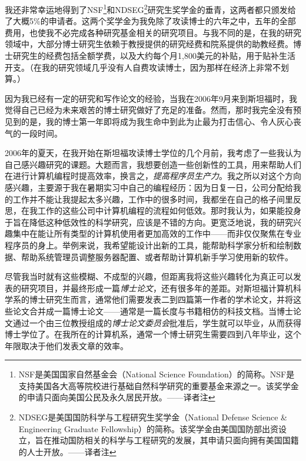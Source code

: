 \documentclass[letter,12pt]{book}
\begin{document}
\begin{CJK}{UTF8}{gbsn}
我还非常幸运地得到了NSF\footnote{NSF是美国国家自然基金会（National Science Foundation）的简称。NSF是支持美国各大高等院校进行基础自然科学研究的重要基金来源之一。该奖学金的申请只面向美国公民及永久居民开放。——译者注}和NDSEG\footnote{NDSEG是美国国防科学与工程研究生奖学金（National Defense Science \& Engineering  Graduate Fellowship）的简称。该奖学金由美国国防部出资设立，旨在推动国防相关的科学与工程研究的发展，其申请只面向拥有美国国籍的人士开放。——译者注}研究生奖学金的垂青，这两者都只颁发给了大概5\%的申请者。这两个奖学金为我免除了攻读博士的六年之中，五年的全部费用，也使我不必完成各种研究基金相关的研究项目。与我不同的是，在我的研究领域中，大部分博士研究生依赖于教授提供的研究经费和院系提供的助教经费。博士研究生的经费包括全额学费，以及大约每个月1,800美元的补贴，用于贴补生活开支。（在我的研究领域几乎没有人自费攻读博士，因为那样在经济上非常不划算。）

因为我已经有一定的研究和写作论文的经验，当我在2006年9月来到斯坦福时，我觉得自己已经为未来艰苦的博士研究做好了充足的准备。然而，那时我完全没有预见到的是，我的博士第一年即将成为我生命中到此为止最为打击信心、令人灰心丧气的一段时间。



2006年的夏天，在我开始在斯坦福攻读博士学位的几个月前，我考虑了一些我认为自己感兴趣研究的课题。大题而言，我想要创造一些创新性的工具，用来帮助人们在进行计算机编程时提高效率，换言之，\emph{提高程序员生产力}。我之所以对这个方向感兴趣，主要源于我在暑期实习中自己的编程经历：因为日复一日，公司分配给我的工作并不能让我提起太多兴趣，工作中的很多时间，我都坐在自己的格子间里反思，在我工作的这些公司中计算机编程的流程如何低效。那时我认为，如果能投身于旨在降低这种低效性的科学研究，应该是不错的方向。更宽泛地说，我的研究兴趣集中在能让所有类型的计算机使用者更加高效的工作中——而非仅仅聚焦在专业程序员的身上。举例来说，我希望能设计出新的工具，能帮助科学家分析和绘制数据、帮助系统管理员调整服务器配置、或者帮助计算机新手学习使用新的软件。

尽管我当时就有这些模糊、不成型的兴趣，但距离我将这些兴趣转化为真正可以发表的研究项目，并最终形成一篇\emph{博士论文}，还有很多年的差距。对斯坦福计算机科学系的博士研究生而言，通常他们需要发表二到四篇第一作者的学术论文，并将这些论文合并成一篇博士论文——通常是一篇长度与书籍相仿的科技文档。当博士论文通过一个由三位教授组成的\emph{博士论文委员会}批准后，学生就可以毕业，从而获得博士学位了。在我所在的计算机系，通常一个博士研究生需要四到八年毕业，这个年限取决于他们发表文章的效率。


\end{CJK}
\end{document}
